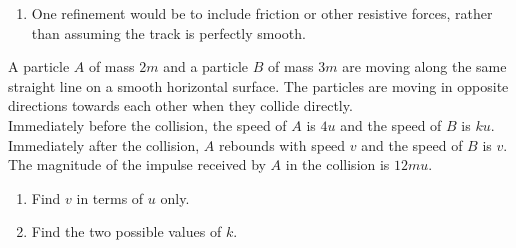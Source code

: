 \documentclass[leqno]{article}
\begin{document}
\begin{enumerate}[
  label=\textbf{\arabic*.},
  leftmargin=*,
  topsep=0pt,
  partopsep=0pt,
  parsep=0pt
]
\begin{djsSolution}
\begin{enumerate}[label=\textbf{(\alph*)}]
  Since the track is smooth, there is no external horizontal force during the collision, so conservation of momentum gives
  \[
  0.5(7) + 1.0(2) = 0.5v_A + 1.0(5)
  \]

  So
  \begin{align*}
  3.5 + 2 &= 0.5v_A + 5 \\
  5.5 &= 0.5v_A + 5 \\
  0.5 &= 0.5v_A \\
  v_A &= 1
  \end{align*}

  The coefficient of restitution is
  \[
  e=\frac{\text{speed of separation}}{\text{speed of approach}}
  \]

  so
  \begin{align*}
  5-1&=e(7-2) \\
  4&=5e \\
  e&=\frac{4}{5}=0.8
  \end{align*}


  \item One refinement would be to include friction or other resistive forces, rather than assuming the track is perfectly smooth.
\end{enumerate}
\end{djsSolution}


\newpage

\questionitem

A particle $A$ of mass $2m$ and a particle $B$ of mass $3m$ are moving along the same straight line on a smooth horizontal surface. The particles are moving in opposite directions towards each other when they collide directly. \\

Immediately before the collision, the speed of $A$ is $4u$ and the speed of $B$ is $ku$. \\
Immediately after the collision, $A$ rebounds with speed $v$ and the speed of $B$ is $v$. \\

The magnitude of the impulse received by $A$ in the collision is $12mu$. \\
\begin{enumerate}[label=\textbf{(\alph*)}]
  \item Find $v$ in terms of $u$ only.  \\
  \item Find the two possible values of $k$.  \\
\end{enumerate}


\end{enumerate}
\end{document}

